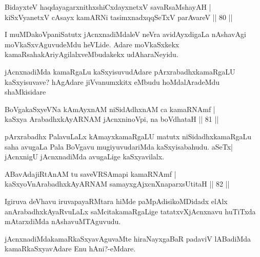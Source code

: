 \begin{shl}
BidayxteV haqdayagarxnithxshiCxdayxnetxV savaRsaMshayAH |\\
kiSxVyanetxV cAsayx kamARNi tasimxnadxqqSeTxV parAvareV \hfill || 80 ||
\end{shl}

\begin{artha}
I muMDakoVpaniSatutx jAcnxnadiMdaleV neVra avidAyxdigaLa nAshavAgi moVkaSxvAguvudeMdu heVLide. Adare moVkaSxkekx kamaRsahakAriyAgilalxveMbudakekx udAharaNeyidu.
\end{artha}

\begin{artha}
jAcnxnadiMda kamaRgaLu kaSxyisuvudAdare pArxrabadhxkamaRgaLU kaSxyisuvave? hAgAdare jiVvanumxkitx eMbudu hoMdalAradeMdu shaMkisidare
\end{artha}


\begin{shl}
BoVgakaSxyeVNa kAmAyxnAM niSidAdhxnAM ca kamaRNAmf |\\
kaSxya ArabadhxkAyARNAM jAcnxninoV\s pi, na boVdhataH \hfill || 81 ||
\end{shl}

\begin{artha}
pArxrabadhx PalavuLaLx kAmayxkamaRgaLU matutx niSidadhxkamaRgaLu saha avugaLa Pala BoVgavu mugiyuvudariMda kaSxyisabahudu. aSeTx| jAcnxnigU jAcnxnadiMda avugaLige kaSxyavilalx.
\end{artha}

\begin{shl}
ABavAdajiRtAnAM tu saveVRSAmapi kamaRNAmf |\\
kaSxyoV\s nArabadhxkAyARNAM samayxgAjxcnXnaparxsUtitaH \hfill || 82 ||
\end{shl}

\begin{artha}
Igiruva deVhavu iruvapayaRMtara hiMde paMpAdisikoMDidadx elAlx  anArabadhxkAyaRvuLaLx saMcitakamaRgaLige tatatxvXjAcnxnavu huTiTxda mAtarxdiMda nAshavuMTAguvudu.
\end{artha}

\begin{artha}
jAcnxnadiMdakamaRkaSxyavAguvaMte hiraNayxgaBaR padaviV lABadiMda kamaRkaSxyavAdare Enu hAni?-eMdare.
\end{artha}


